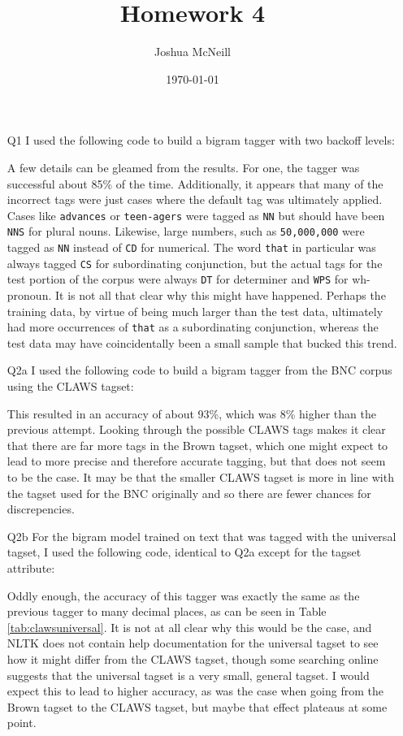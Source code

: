 \documentclass{article}
\title{Homework 4}
\author{Joshua McNeill}
\date{\today}
\begin{document}
  \maketitle
  \begin{itemize}
    \item[Q1] I used the following code to build a bigram tagger with two backoff levels:
    
    A few details can be gleamed from the results. For one, the tagger was successful about 85\% of the time. Additionally, it appears that many of the incorrect tags were just cases where the default tag was ultimately applied. Cases like \texttt{advances} or \texttt{teen-agers} were tagged as \texttt{NN} but should have been \texttt{NNS} for plural nouns. Likewise, large numbers, such as \texttt{50,000,000} were tagged as \texttt{NN} instead of \texttt{CD} for numerical. The word \texttt{that} in particular was always tagged \texttt{CS} for subordinating conjunction, but the actual tags for the test portion of the corpus were always \texttt{DT} for determiner and \texttt{WPS} for wh-pronoun. It is not all that clear why this might have happened. Perhaps the training data, by virtue of being much larger than the test data, ultimately had more occurrences of \texttt{that} as a subordinating conjunction, whereas the test data may have coincidentally been a small sample that bucked this trend.
    \item[Q2a] I used the following code to build a bigram tagger from the BNC corpus using the CLAWS tagset:
    
    This resulted in an accuracy of about 93\%, which was 8\% higher than the previous attempt. Looking through the possible CLAWS tags makes it clear that there are far more tags in the Brown tagset, which one might expect to lead to more precise and therefore accurate tagging, but that does not seem to be the case. It may be that the smaller CLAWS tagset is more in line with the tagset used for the BNC originally and so there are fewer chances for discrepencies.
    \item[Q2b] For the bigram model trained on text that was tagged with the universal tagset, I used the following code, identical to Q2a except for the tagset attribute:
    
    Oddly enough, the accuracy of this tagger was exactly the same as the previous tagger to many decimal places, as can be seen in Table \ref{tab:clawsuniversal}. It is not at all clear why this would be the case, and NLTK does not contain help documentation for the universal tagset to see how it might differ from the CLAWS tagset, though some searching online suggests that the universal tagset is a very small, general tagset. I would expect this to lead to higher accuracy, as was the case when going from the Brown tagset to the CLAWS tagset, but maybe that effect plateaus at some point.

\end{itemize}
\end{document}
